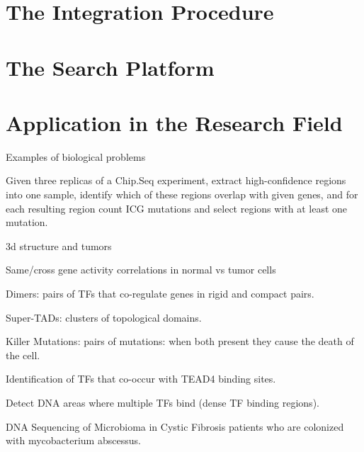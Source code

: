 \documentclass[journal]{IEEEtran}
\begin{document}
\section{The Integration Procedure}

\section{The Search Platform}

\section{Application in the Research Field}

Examples of biological problems

Given three replicas of a Chip.Seq experiment, extract high-confidence regions into one sample, identify which of these regions overlap with given genes, and for each resulting region count ICG mutations and select regions with at least one mutation.

3d structure and tumors

Same/cross gene activity correlations in normal vs tumor cells

Dimers: pairs of TFs that co-regulate genes in rigid and compact pairs.

Super-TADs: clusters of topological domains.

Killer Mutations: pairs of mutations: when both present they cause the death of the cell.

Identification of TFs that co-occur with TEAD4 binding sites.

Detect DNA areas where multiple TFs bind (dense TF binding regions).

DNA Sequencing of Microbioma in Cystic Fibrosis patients who are colonized with mycobacterium abscessus.
\end{document}
